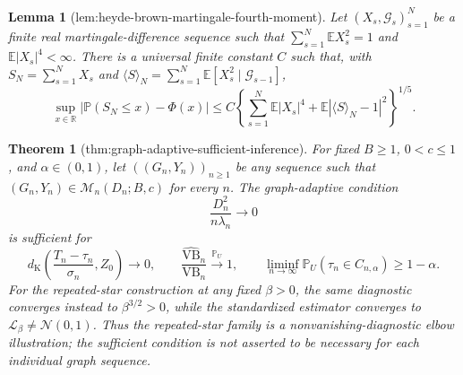 \documentclass{article}
\newtheorem{theorem}{Theorem}
\newtheorem{lemma}{Lemma}
\begin{document}
\begin{lemma}[lem:heyde-brown-martingale-fourth-moment]\label{lem:heyde-brown-martingale-fourth-moment}
Let \((X_s,\mathcal G_s)_{s=1}^N\) be a finite real martingale-difference sequence such that \(\sum_{s=1}^N\mathbb E X_s^2=1\) and \(\mathbb E|X_s|^4<\infty\).  There is a universal finite constant \(C\) such that, with \(S_N=\sum_{s=1}^N X_s\) and \(\langle S\rangle_N=\sum_{s=1}^N\mathbb E[X_s^2\mid\mathcal G_{s-1}]\),
\[
 \sup_{x\in\mathbb R}\left|\mathbb P(S_N\le x)-\Phi(x)\right|
 \le C\left\{\sum_{s=1}^N\mathbb E|X_s|^4+
 \mathbb E|\langle S\rangle_N-1|^2\right\}^{1/5}.
\]
\end{lemma}

\begin{theorem}[thm:graph-adaptive-sufficient-inference]\label{thm:graph-adaptive-sufficient-inference}
For fixed \(B\ge1\), \(0<c\le1\), and \(\alpha\in(0,1)\), let \(((G_n,Y_n))_{n\ge1}\) be any sequence such that \((G_n,Y_n)\in\mathcal M_n(D_n;B,c)\) for every \(n\).  The graph-adaptive condition
\[
 \frac{D_n^2}{n\lambda_n}\longrightarrow0
\]
is sufficient for
\[
 d_{\mathrm K}\left(\frac{T_n-\tau_n}{\sigma_n},Z_0\right)\longrightarrow0,
 \qquad
 \frac{\widehat{\mathrm{VB}}_n}{\mathrm{VB}_n}
 \xrightarrow{\mathbb P_U}1,
 \qquad
 \liminf_{n\to\infty}\mathbb P_U(\tau_n\in C_{n,\alpha})\ge1-\alpha.
\]
For the repeated-star construction at any fixed \(\beta>0\), the same diagnostic converges instead to \(\beta^{3/2}>0\), while the standardized estimator converges to \(\mathcal L_{\beta}\ne\mathcal N(0,1)\).  Thus the repeated-star family is a nonvanishing-diagnostic elbow illustration; the sufficient condition is not asserted to be necessary for each individual graph sequence.
\end{theorem}
\end{document}
